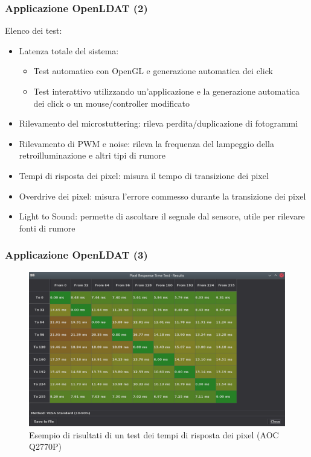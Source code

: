 \documentclass[xcolor={x11names}]{beamer}
\begin{document}
\begin{frame}[shrink=7]
	\frametitle{Applicazione OpenLDAT (2)}
	Elenco dei test:\begin{itemize}
		\item \alert{Latenza totale del sistema}:\begin{itemize}
			\item \alert{Test automatico} con OpenGL e generazione automatica dei click
			\item \alert{Test interattivo} utilizzando un'applicazione e la generazione automatica dei click o un mouse/controller modificato
		\end{itemize}
		\item \alert{Rilevamento del microstuttering}: rileva perdita/duplicazione di fotogrammi
		\item \alert{Rilevamento di PWM e noise}: rileva la frequenza del lampeggio della retroilluminazione e altri tipi di rumore
		\item \alert{Tempi di risposta dei pixel}: misura il tempo di transizione dei pixel
		\item \alert{Overdrive dei pixel}: misura l'errore commesso durante la transizione dei pixel
		\item \alert{Light to Sound}: permette di ascoltare il segnale dal sensore, utile per rilevare fonti di rumore
	\end{itemize}
\end{frame}
\begin{frame}[shrink=10]
	\frametitle{Applicazione OpenLDAT (3)}
	\begin{figure}
		\includegraphics[width=\textwidth]{Applicazione_files/gui_pixelresponse_results.png}
		\caption*{Esempio di risultati di un test dei tempi di risposta dei pixel (AOC Q2770P)}
	\end{figure}
\end{frame}
\end{document}
